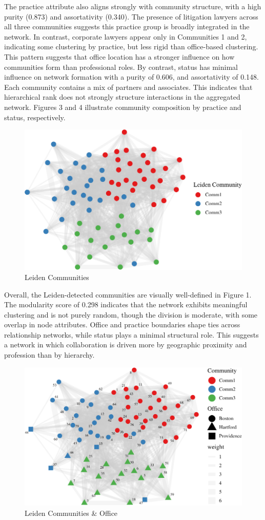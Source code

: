 \documentclass[
]{article}
\begin{document}
The practice attribute also aligns strongly with community structure,
with a high purity (0.873) and assortativity (0.340). The presence of
litigation lawyers across all three communities suggests this practice
group is broadly integrated in the network. In contrast, corporate
lawyers appear only in Communities 1 and 2, indicating some clustering
by practice, but less rigid than office-based clustering. This pattern
suggests that office location has a stronger influence on how
communities form than professional roles. By contrast, status has
minimal influence on network formation with a purity of 0.606, and
assortativity of 0.148. Each community contains a mix of partners and
associates. This indicates that hierarchical rank does not strongly
structure interactions in the aggregated network. Figures 3 and 4
illustrate community composition by practice and status, respectively.

\begin{figure}

{\centering \includegraphics[width=0.6\linewidth]{46062_files/figure-latex/plot_community-1} 

}

\caption{Leiden Communities}\label{fig:plot_community}
\end{figure}

Overall, the Leiden-detected communities are visually well-defined in
Figure 1. The modularity score of 0.298 indicates that the network
exhibits meaningful clustering and is not purely random, though the
division is moderate, with some overlap in node attributes. Office and
practice boundaries shape ties across relationship networks, while
status plays a minimal structural role. This suggests a network in which
collaboration is driven more by geographic proximity and profession than
by hierarchy.

\begin{figure}

{\centering \includegraphics[width=0.6\linewidth]{46062_files/figure-latex/plot_office-1} 

}

\caption{Leiden Communities \& Office}\label{fig:plot_office}
\end{figure}
\end{document}
